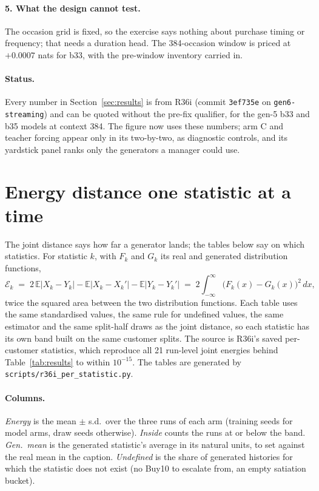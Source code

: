 \documentclass[11pt]{article}
\newcommand{\E}{\mathbb{E}}
\begin{document}
\paragraph{5. What the design cannot test.} The occasion grid is fixed, so the
exercise says nothing about purchase timing or frequency; that needs a duration
head. The 384-occasion window is priced at $+0.0007$ nats for b33, with the
pre-window inventory carried in.

\paragraph{Status.} Every number in Section~\ref{sec:results} is from R36i
(commit \texttt{3ef735e} on \texttt{gen6-streaming}) and can be quoted without
the pre-fix qualifier, for the gen-5 b33 and b35 models at context 384. The
figure now uses these numbers; arm C and teacher forcing appear only in its
two-by-two, as diagnostic controls, and its yardstick panel ranks only the
generators a manager could use.

\appendix
\section{Energy distance one statistic at a time}\label{app:perstat}

The joint distance says how far a generator lands; the tables below say on which
statistics. For statistic $k$, with $F_k$ and $G_k$ its real and generated
distribution functions,
\begin{equation}
\mathcal{E}_k \;=\; 2\,\E|X_k - Y_k| - \E|X_k - X_k'| - \E|Y_k - Y_k'|
\;=\; 2\int_{-\infty}^{\infty}\big(F_k(x) - G_k(x)\big)^2\,dx,
\end{equation}
twice the squared area between the two distribution functions. Each table uses
the same standardised values, the same rule for undefined values, the same
estimator and the same split-half draws as the joint distance, so each
statistic has its own band built on the same customer splits. The source is
R36i's saved per-customer statistics, which reproduce all 21 run-level joint
energies behind Table~\ref{tab:results} to within $10^{-15}$. The tables are generated by
\texttt{scripts/r36i\_per\_statistic.py}.

\paragraph{Columns.} \emph{Energy} is the mean $\pm$ s.d.\ over the three runs
of each arm (training seeds for model arms, draw seeds otherwise). \emph{Inside}
counts the runs at or below the band. \emph{Gen.\ mean} is the generated
statistic's average in its natural units, to set against the real mean in the
caption. \emph{Undefined} is the share of generated histories for which the
statistic does not exist (no Buy10 to escalate from, an empty satiation
bucket).
\end{document}
